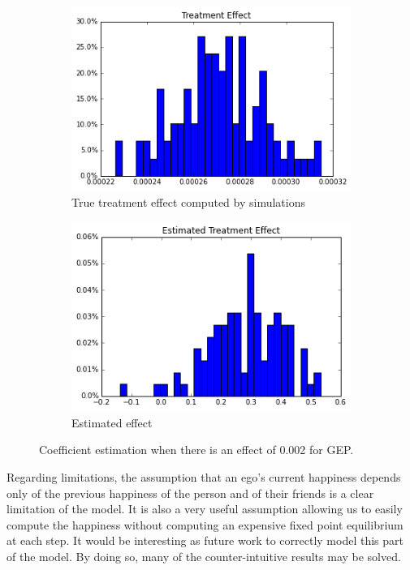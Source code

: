 \documentclass[11pt]{article}
\begin{document}
\begin{figure}[h]
\centering
\begin{subfigure}{.5\textwidth}
  \centering
  \includegraphics[width=.9\linewidth]{treatment_effect_no_influence.png}
  \caption{True treatment effect computed by simulations}
  \label{fig:sub1}
\end{subfigure}%
\begin{subfigure}{.5\textwidth}
  \centering
  \includegraphics[width=.9\linewidth]{estimated_large_effect_gep.png}
  \caption{Estimated effect}
  \label{fig:sub2}
\end{subfigure}
\caption{Coefficient estimation when there is an effect of 0.002 for GEP.}
\label{fig:large_effect_gep}
\end{figure}

Regarding limitations, the assumption that an ego's current happiness depends only of the previous happiness of the person and of their friends is a clear limitation of the model. It is also a very useful assumption allowing us to easily compute the happiness without computing an expensive fixed point equilibrium at each step. It would be interesting as future work to correctly model this part of the model. By doing so, many of the counter-intuitive results may be solved. \\
\end{document}
